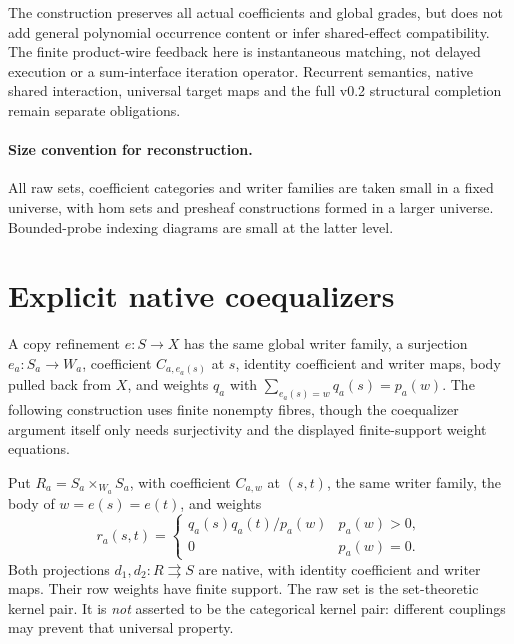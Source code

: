\documentclass[11pt]{article}
\begin{document}
The construction preserves all actual coefficients and global grades, but does not add general polynomial occurrence content or infer shared-effect compatibility. The finite product-wire feedback here is instantaneous matching, not delayed execution or a sum-interface iteration operator. Recurrent semantics, native shared interaction, universal target maps and the full v0.2 structural completion remain separate obligations.
\paragraph{Size convention for reconstruction.} All raw sets, coefficient categories and writer families are taken small in a fixed universe, with hom sets and presheaf constructions formed in a larger universe. Bounded-probe indexing diagrams are small at the latter level.

\section{Explicit native coequalizers}
A copy refinement $e:S\to X$ has the same global writer family, a surjection
$e_a:S_a\to W_a$, coefficient $C_{a,e_a(s)}$ at $s$, identity coefficient
and writer maps, body pulled back from $X$, and weights $q_a$ with
$\sum_{e_a(s)=w}q_a(s)=p_a(w)$. The following construction uses finite
nonempty fibres, though the coequalizer argument itself only needs
surjectivity and the displayed finite-support weight equations.

Put $R_a=S_a\times_{W_a}S_a$, with coefficient $C_{a,w}$ at $(s,t)$,
the same writer family, the body of $w=e(s)=e(t)$, and weights
\[
 r_a(s,t)=\begin{cases}q_a(s)q_a(t)/p_a(w)&p_a(w)>0,\\0&p_a(w)=0.\end{cases}
\]
Both projections $d_1,d_2:R\rightrightarrows S$ are native, with identity
coefficient and writer maps. Their row weights have finite support.
The raw set is the set-theoretic kernel pair. It is \emph{not} asserted to
be the categorical kernel pair: different couplings may prevent that
universal property.
\end{document}
